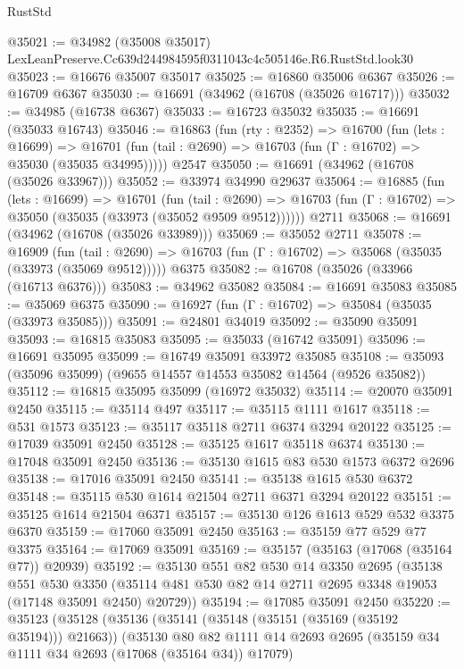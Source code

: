 \begin{lexlean}{RustStd}
\begin{coremodule}
@35021 := @34982 (@35008 @35017) LexLeanPreserve.Cc639d244984595f0311043c4c505146e.R6.RustStd.look30
@35023 := @16676 @35007 @35017
@35025 := @16860 @35006 @6367
@35026 := @16709 @6367
@35030 := @16691 (@34962 (@16708 (@35026 @16717)))
@35032 := @34985 (@16738 @6367)
@35033 := @16723 @35032
@35035 := @16691 (@35033 @16743)
@35046 := @16863
    (fun (rty : @2352) =>
    @16700
      (fun (lets : @16699) =>
      @16701 (fun (tail : @2690) => @16703 (fun (Γ : @16702) => @35030 (@35035 @34995)))))
    @2547
@35050 := @16691 (@34962 (@16708 (@35026 @33967)))
@35052 := @33974 @34990 @29637
@35064 := @16885
    (fun (lets : @16699) =>
    @16701
      (fun (tail : @2690) =>
      @16703 (fun (Γ : @16702) => @35050 (@35035 (@33973 (@35052 @9509 @9512))))))
    @2711
@35068 := @16691 (@34962 (@16708 (@35026 @33989)))
@35069 := @35052 @2711
@35078 := @16909
    (fun (tail : @2690) => @16703 (fun (Γ : @16702) => @35068 (@35035 (@33973 (@35069 @9512)))))
    @6375
@35082 := @16708 (@35026 (@33966 (@16713 @6376)))
@35083 := @34962 @35082
@35084 := @16691 @35083
@35085 := @35069 @6375
@35090 := @16927 (fun (Γ : @16702) => @35084 (@35035 (@33973 @35085)))
@35091 := @24801 @34019
@35092 := @35090 @35091
@35093 := @16815 @35083
@35095 := @35033 (@16742 @35091)
@35096 := @16691 @35095
@35099 := @16749 @35091 @33972 @35085
@35108 := @35093 (@35096 @35099) (@9655 @14557 @14553 @35082 @14564 (@9526 @35082))
@35112 := @16815 @35095 @35099 (@16972 @35032)
@35114 := @20070 @35091 @2450
@35115 := @35114 @497
@35117 := @35115 @1111 @1617
@35118 := @531 @1573
@35123 := @35117 @35118 @2711 @6374 @3294 @20122
@35125 := @17039 @35091 @2450
@35128 := @35125 @1617 @35118 @6374
@35130 := @17048 @35091 @2450
@35136 := @35130 @1615 @83 @530 @1573 @6372 @2696
@35138 := @17016 @35091 @2450
@35141 := @35138 @1615 @530 @6372
@35148 := @35115 @530 @1614 @21504 @2711 @6371 @3294 @20122
@35151 := @35125 @1614 @21504 @6371
@35157 := @35130 @126 @1613 @529 @532 @3375 @6370
@35159 := @17060 @35091 @2450
@35163 := @35159 @77 @529 @77 @3375
@35164 := @17069 @35091
@35169 := @35157 (@35163 (@17068 (@35164 @77)) @20939)
@35192 := @35130
    @551
    @82
    @530
    @14
    @3350
    @2695
    (@35138
      @551
      @530
      @3350
      (@35114 @481 @530 @82 @14 @2711 @2695 @3348 @19053 (@17148 @35091 @2450) @20729))
@35194 := @17085 @35091 @2450
@35220 := @35123
    (@35128
      (@35136
        (@35141 (@35148 (@35151 (@35169 (@35192 @35194))) @21663))
        (@35130
          @80
          @82
          @1111
          @14
          @2693
          @2695
          (@35159 @34 @1111 @34 @2693 (@17068 (@35164 @34)) @17079)

\end{coremodule}
\end{lexlean}
